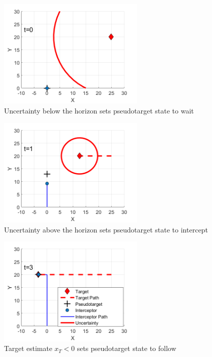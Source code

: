 \documentclass[conference]{IEEEtran}
\begin{document}
\begin{figure}[H]
	\centering
	\includegraphics[width=7cm]{step1}
	\caption{Uncertainty below the horizon sets pseudotarget state to wait}
	\label{}
\end{figure}

\begin{figure}[H]
	\centering
	\includegraphics[width=7cm]{step2}
	\caption{Uncertainty above the horizon sets pseudotarget state to intercept}
	\label{}
\end{figure}

\begin{figure}[H]
	\centering
	\includegraphics[width=7cm]{step3}
	\caption{Target estimate $x_T < 0$ sets pseudotarget state to follow}
	\label{}
\end{figure}

\end{document}
